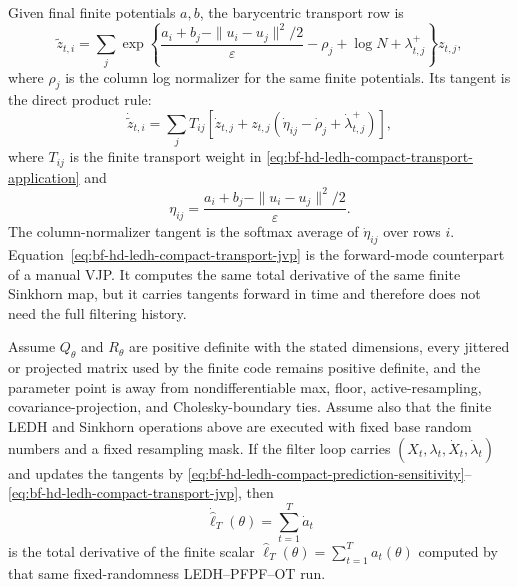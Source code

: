 Given final finite potentials \(a,b\), the barycentric transport row is
\begin{equation}
  \tilde z_{t,i}
  =
  \sum_j
  \exp\left\{
    \frac{a_i+b_j-\|u_i-u_j\|^2/2}{\varepsilon}
    -\rho_j+\log N+\lambda^+_{t,j}
  \right\}z_{t,j},
  \label{eq:bf-hd-ledh-compact-transport-application}
\end{equation}
where \(\rho_j\) is the column log normalizer for the same finite potentials.
Its tangent is the direct product rule:
\begin{equation}
  \dot{\tilde z}_{t,i}
  =
  \sum_j T_{ij}\left[
    \dot z_{t,j}
    + z_{t,j}
      \left(
        \dot\eta_{ij}-\dot\rho_j+\dot\lambda^+_{t,j}
      \right)
  \right],
  \label{eq:bf-hd-ledh-compact-transport-jvp}
\end{equation}
where \(T_{ij}\) is the finite transport weight in
\eqref{eq:bf-hd-ledh-compact-transport-application} and
\[
  \eta_{ij}
  =
  \frac{a_i+b_j-\|u_i-u_j\|^2/2}{\varepsilon}.
\]
The column-normalizer tangent is the softmax average of \(\dot\eta_{ij}\) over
rows \(i\).  Equation~\eqref{eq:bf-hd-ledh-compact-transport-jvp} is the
forward-mode counterpart of a manual VJP.  It computes the same total
derivative of the same finite Sinkhorn map, but it carries tangents forward in
time and therefore does not need the full filtering history.

\begin{proposition}
\label{prop:bf-hd-ledh-compact-sensitivity-score}
Assume \(Q_\theta\) and \(R_\theta\) are positive definite with the stated
dimensions, every jittered or projected matrix used by the finite code remains
positive definite, and the parameter point is away from nondifferentiable max,
floor, active-resampling, covariance-projection, and Cholesky-boundary ties.
Assume also that the finite LEDH and Sinkhorn operations above are executed with
fixed base random numbers and a fixed resampling mask.  If the filter loop carries
\((X_t,\lambda_t,\dot X_t,\dot\lambda_t)\) and updates the tangents by
\eqref{eq:bf-hd-ledh-compact-prediction-sensitivity}--
\eqref{eq:bf-hd-ledh-compact-transport-jvp}, then
\begin{equation}
  \dot{\widehat\ell}_T(\theta)
  =
  \sum_{t=1}^T \dot a_t
  \label{eq:bf-hd-ledh-compact-score}
\end{equation}
is the total derivative of the finite scalar
\(\widehat\ell_T(\theta)=\sum_{t=1}^T a_t(\theta)\) computed by that same
fixed-randomness LEDH--PFPF--OT run.
\end{proposition}

